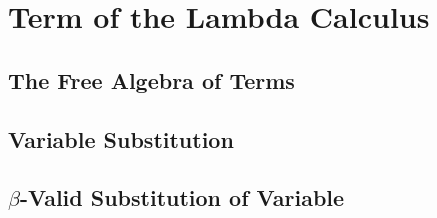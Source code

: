 \section{Term of the Lambda Calculus}
    \subsection{The Free Algebra of Terms}
        
    \subsection{Variable Substitution}
        
    \subsection{$\beta$-Valid Substitution of Variable}
        

